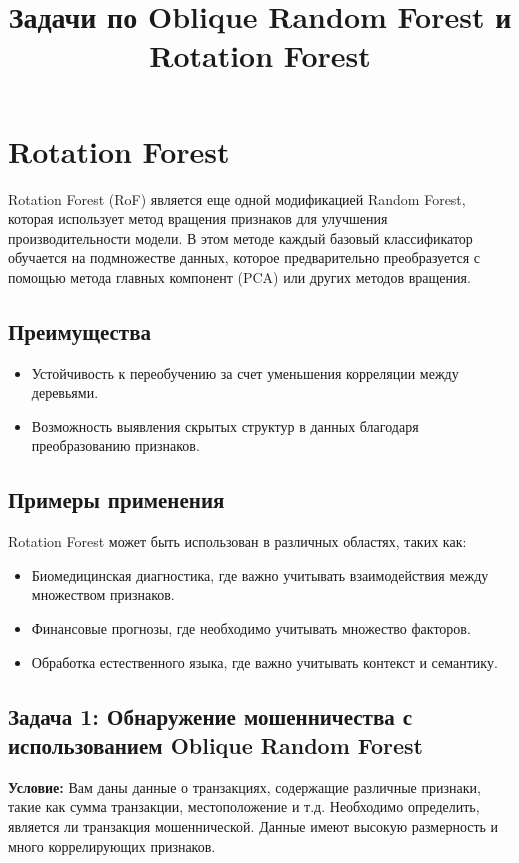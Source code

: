 \section{Rotation Forest}
Rotation Forest (RoF) является еще одной модификацией Random Forest, которая использует метод вращения признаков для улучшения производительности модели. В этом методе каждый базовый классификатор обучается на подмножестве данных, которое предварительно преобразуется с помощью метода главных компонент (PCA) или других методов вращения.

\subsection{Преимущества}
\begin{itemize}
    \item Устойчивость к переобучению за счет уменьшения корреляции между деревьями.
    \item Возможность выявления скрытых структур в данных благодаря преобразованию признаков.
\end{itemize}

\subsection{Примеры применения}
Rotation Forest может быть использован в различных областях, таких как:
\begin{itemize}
    \item Биомедицинская диагностика, где важно учитывать взаимодействия между множеством признаков.
    \item Финансовые прогнозы, где необходимо учитывать множество факторов.
    \item Обработка естественного языка, где важно учитывать контекст и семантику.
\end{itemize}

\title{Задачи по Oblique Random Forest и Rotation Forest}
\author{}
\date{}
\maketitle

\subsection*{Задача 1: Обнаружение мошенничества с использованием Oblique Random Forest}

\textbf{Условие:}
Вам даны данные о транзакциях, содержащие различные признаки, такие как сумма транзакции, местоположение и т.д. Необходимо определить, является ли транзакция мошеннической. Данные имеют высокую размерность и много коррелирующих признаков.

